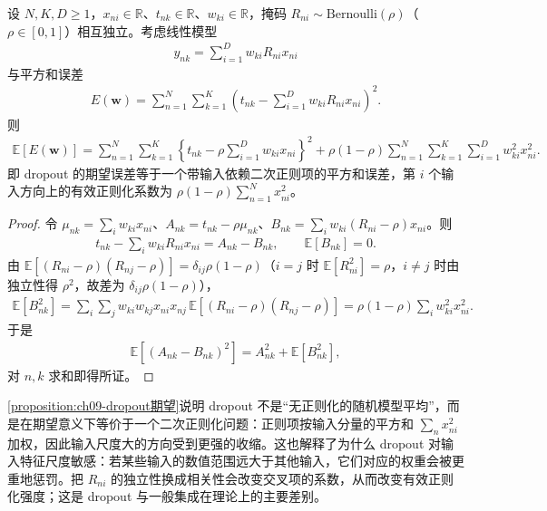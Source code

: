 \documentclass[../../main.tex]{subfiles}
\begin{document}
\begin{proposition}\label{proposition:ch09-dropout期望}
设 $N,K,D\geqslant1$，$x_{ni}\in\mathbb{R}$、$t_{nk}\in\mathbb{R}$、$w_{ki}\in\mathbb{R}$，掩码 $R_{ni}\sim\mathrm{Bernoulli}(\rho)$（$\rho\in[0,1]$）相互独立。考虑线性模型
\begin{align*}
y_{nk}=\sum_{i=1}^{D}w_{ki}R_{ni}x_{ni}
\end{align*}
与平方和误差
\begin{align*}
E(\boldsymbol{w})=\sum_{n=1}^{N}\sum_{k=1}^{K}\left(t_{nk}-\sum_{i=1}^{D}w_{ki}R_{ni}x_{ni}\right)^{2}.
\end{align*}
则
\begin{align*}
\mathbb{E}[E(\boldsymbol{w})]
=\sum_{n=1}^{N}\sum_{k=1}^{K}\left\{t_{nk}-\rho\sum_{i=1}^{D}w_{ki}x_{ni}\right\}^{2}
+\rho(1-\rho)\sum_{n=1}^{N}\sum_{k=1}^{K}\sum_{i=1}^{D}w_{ki}^{2}x_{ni}^{2}.
\end{align*}
即 dropout 的期望误差等于一个带输入依赖二次正则项的平方和误差，第 $i$ 个输入方向上的有效正则化系数为 $\rho(1-\rho)\sum_{n=1}^{N}x_{ni}^{2}$。
\end{proposition}

\begin{proof}
令 $\mu_{nk}=\sum_{i}w_{ki}x_{ni}$、$A_{nk}=t_{nk}-\rho\mu_{nk}$、$B_{nk}=\sum_{i}w_{ki}(R_{ni}-\rho)x_{ni}$。则
\begin{align*}
t_{nk}-\sum_{i}w_{ki}R_{ni}x_{ni}=A_{nk}-B_{nk},\qquad \mathbb{E}[B_{nk}]=0.
\end{align*}
由 $\mathbb{E}[(R_{ni}-\rho)(R_{nj}-\rho)]=\delta_{ij}\rho(1-\rho)$（$i=j$ 时 $\mathbb{E}[R_{ni}^{2}]=\rho$，$i\neq j$ 时由独立性得 $\rho^{2}$，故差为 $\delta_{ij}\rho(1-\rho)$），
\begin{align*}
\mathbb{E}[B_{nk}^{2}]=\sum_{i}\sum_{j}w_{ki}w_{kj}x_{ni}x_{nj}\,\mathbb{E}[(R_{ni}-\rho)(R_{nj}-\rho)]
=\rho(1-\rho)\sum_{i}w_{ki}^{2}x_{ni}^{2}.
\end{align*}
于是
\begin{align*}
\mathbb{E}\left[(A_{nk}-B_{nk})^{2}\right]=A_{nk}^{2}+\mathbb{E}[B_{nk}^{2}],
\end{align*}
对 $n,k$ 求和即得所证。
\end{proof}

\begin{remark}\cref{proposition:ch09-dropout期望}说明 dropout 不是“无正则化的随机模型平均”，而是在期望意义下等价于一个二次正则化问题：正则项按输入分量的平方和 $\sum_n x_{ni}^{2}$ 加权，因此输入尺度大的方向受到更强的收缩。这也解释了为什么 dropout 对输入特征尺度敏感：若某些输入的数值范围远大于其他输入，它们对应的权重会被更重地惩罚。把 $R_{ni}$ 的独立性换成相关性会改变交叉项的系数，从而改变有效正则化强度；这是 dropout 与一般集成在理论上的主要差别。
\end{remark}
\end{document}
